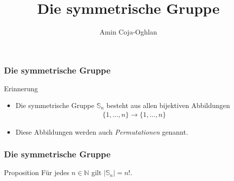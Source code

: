 \documentclass{beamer}
\title[Linadi]{Die symmetrische Gruppe}
\author[Amin Coja-Oghlan]{Amin Coja-Oghlan}
\institute[Frankfurt]{JWGUFFM}
\date{}
\renewcommand{\emph}[1]{{\textcolor{solarizedRed}{\itshape #1}}}
\newcommand\NN{\mathbb N}
\renewcommand\SS{\mathbb S}
\renewcommand{\oe}{\"o}
\newcommand{\ue}{\"u}
\begin{document}
\frame[plain]{\titlepage}

\begin{frame}\frametitle{Die symmetrische Gruppe}
\begin{block}{Erinnerung}
\begin{itemize}
\item Die symmetrische Gruppe $\SS_n$ besteht aus allen bijektiven Abbildungen
	\begin{align*}
		\{1,\ldots,n\}\to\{1,\ldots,n\}
	\end{align*}
\item Diese Abbildungen werden auch \emph{Permutationen} genannt.
\end{itemize}
\end{block}
\end{frame}

\begin{frame}\frametitle{Die symmetrische Gruppe}
	\begin{block}{Proposition}
		F\ue r jedes $n\in\NN$ gilt $|\SS_n|=n!$\enspace.
	\end{block}

\end{frame}
\end{document}
